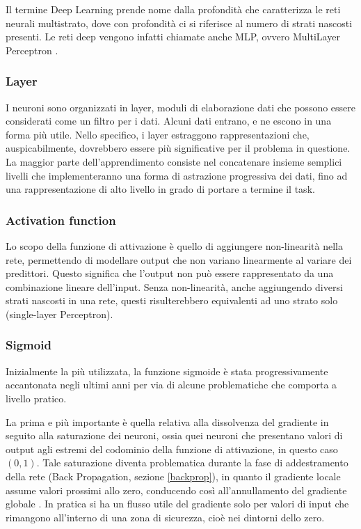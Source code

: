 Il termine Deep Learning prende nome dalla profondità che caratterizza le reti neurali multistrato, dove con profondità ci si riferisce al numero di strati nascosti presenti. Le reti deep vengono infatti chiamate anche MLP, ovvero MultiLayer Perceptron \cite{goodfellow2016deep}.


\subsubsection{Layer}
I neuroni sono organizzati in layer, moduli di elaborazione dati che possono essere considerati come un filtro per i dati. Alcuni dati entrano, e ne escono in una forma più utile. Nello specifico, i layer estraggono rappresentazioni che, auspicabilmente, dovrebbero essere più significative per il problema in questione. La maggior parte dell'apprendimento consiste nel concatenare insieme semplici livelli che implementeranno una forma di astrazione progressiva dei dati, fino ad una rappresentazione di alto livello in grado di portare a termine il task.

\subsubsection{Activation function}
Lo scopo della funzione di attivazione è quello di aggiungere non-linearità nella rete, permettendo di modellare output che non variano linearmente al variare dei predittori. Questo significa che l'output non può essere rappresentato da una combinazione lineare dell'input. Senza non-linearità, anche aggiungendo diversi strati nascosti in una rete, questi risulterebbero equivalenti ad uno strato solo (single-layer Perceptron).

\subsubsection{Sigmoid}
Inizialmente la più utilizzata, la funzione sigmoide è stata progressivamente accantonata negli ultimi anni per via di alcune problematiche che comporta a livello pratico.

La prima e più importante è quella relativa alla dissolvenza del gradiente in seguito alla saturazione dei neuroni, ossia quei neuroni che presentano valori di output agli estremi del codominio della funzione di attivazione, in questo caso $(0, 1)$. Tale saturazione diventa problematica durante la fase di addestramento della rete (Back Propagation, sezione \ref{backprop}), in quanto il gradiente locale assume valori prossimi allo zero, conducendo così all'annullamento del gradiente globale \cite{glorot2010understanding}. In pratica si ha un flusso utile del gradiente solo per valori di input che rimangono all'interno di una zona di sicurezza, cioè nei dintorni dello zero.

